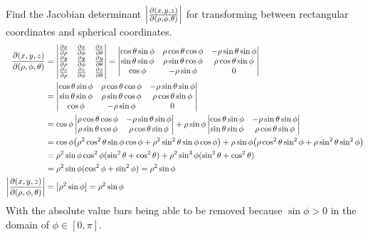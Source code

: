 \begin{example}  
    Find the Jacobian determinant \( \abs{\pdv{(x,y,z)}{(\rho,\phi,\theta)}} \) for transforming between rectangular coordinates and spherical coordinates.
    \begin{align*}
        \pdv{(x,y,z)}{(\rho,\phi,\theta)} &= \begin{vmatrix}
            \pdv{x}{\rho} & \pdv{x}{\phi} & \pdv{x}{\theta} \\
            \pdv{y}{\rho} & \pdv{y}{\phi} & \pdv{y}{\theta} \\
            \pdv{z}{\rho} & \pdv{z}{\phi} & \pdv{z}{\theta}
        \end{vmatrix} = \begin{vmatrix}
            \cos\theta\sin\phi & \rho \cos\theta\cos\phi & -\rho\sin\theta\sin\phi \\
            \sin\theta\sin\phi & \rho\sin\theta\cos\phi & \rho\cos\theta\sin\phi \\
            \cos\phi & -\rho\sin\phi & 0
        \end{vmatrix} \\
        &= \begin{vmatrix}
            \cos\theta\sin\phi & \rho \cos\theta\cos\phi & -\rho\sin\theta\sin\phi \\
            \sin\theta\sin\phi & \rho\sin\theta\cos\phi & \rho\cos\theta\sin\phi \\
            \cos\phi & -\rho\sin\phi & 0
        \end{vmatrix} \\
        &= \cos\phi \begin{vmatrix}
            \rho\cos\theta\cos\phi & -\rho\sin\theta\sin\phi \\
            \rho\sin\theta\cos\phi & \rho\cos\theta\sin\phi
        \end{vmatrix} + \rho\sin\phi\begin{vmatrix}
            \cos\theta\sin\phi & -\rho \sin\theta\sin\phi \\
            \sin\theta\sin\phi & \rho\cos\theta\sin\phi
        \end{vmatrix} \\
        &= \cos\phi\pqty{\rho^2\cos^2\theta\sin\phi\cos\phi + \rho^2\sin^2\theta\sin\phi\cos\phi} + \rho\sin\phi\pqty{\rho\cos^2\theta\sin^2\phi + \rho\sin^2\theta\sin^2\phi} \\
        &=\rho^2\sin\phi\cos^2\phi(\sin^2\theta+\cos^2\theta) + \rho^2\sin^3\phi(\sin^2\theta + \cos^2\theta) \\
        &= \rho^2\sin\phi(\cos^2\phi + \sin^2\phi) = \rho^2\sin\phi \\
        \abs{\pdv{(x,y,z)}{(\rho,\phi,\theta)}} &= \abs{\rho^2\sin\phi} = \rho^2\sin\phi
    \end{align*}
    With the absolute value bars being able to be removed because $\sin\phi>0$ in the domain of $\phi\in[0, \pi]$. 
\end{example}